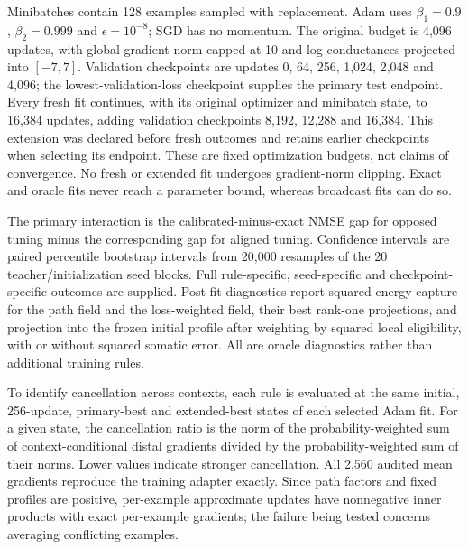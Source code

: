 Minibatches contain 128 examples sampled with replacement. Adam uses $\beta_1=0.9$, $\beta_2=0.999$ and $\epsilon=10^{-8}$; SGD has no momentum. The original budget is 4,096 updates, with global gradient norm capped at 10 and log conductances projected into $[-7,7]$. Validation checkpoints are updates 0, 64, 256, 1,024, 2,048 and 4,096; the lowest-validation-loss checkpoint supplies the primary test endpoint. Every fresh fit continues, with its original optimizer and minibatch state, to 16,384 updates, adding validation checkpoints 8,192, 12,288 and 16,384. This extension was declared before fresh outcomes and retains earlier checkpoints when selecting its endpoint. These are fixed optimization budgets, not claims of convergence. No fresh or extended fit undergoes gradient-norm clipping. Exact and oracle fits never reach a parameter bound, whereas broadcast fits can do so.

The primary interaction is the calibrated-minus-exact NMSE gap for opposed tuning minus the corresponding gap for aligned tuning. Confidence intervals are paired percentile bootstrap intervals from 20,000 resamples of the 20 teacher/initialization seed blocks. Full rule-specific, seed-specific and checkpoint-specific outcomes are supplied. Post-fit diagnostics report squared-energy capture for the path field and the loss-weighted field, their best rank-one projections, and projection into the frozen initial profile after weighting by squared local eligibility, with or without squared somatic error. All are oracle diagnostics rather than additional training rules.

To identify cancellation across contexts, each rule is evaluated at the same initial, 256-update, primary-best and extended-best states of each selected Adam fit. For a given state, the cancellation ratio is the norm of the probability-weighted sum of context-conditional distal gradients divided by the probability-weighted sum of their norms. Lower values indicate stronger cancellation. All 2,560 audited mean gradients reproduce the training adapter exactly. Since path factors and fixed profiles are positive, per-example approximate updates have nonnegative inner products with exact per-example gradients; the failure being tested concerns averaging conflicting examples.

